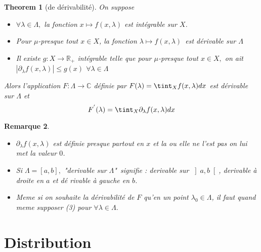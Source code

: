 \documentclass[3pt]{article}
\newtheorem{theorem}{Theorem}
\newtheorem{remark}[theorem]{Remarque}
\begin{document}
\bigskip 

\begin{theorem}[de d\'{e}rivabilit\'{e}]
On suppose

\begin{itemize}
\item $\forall \lambda \in \Lambda ,$ la fonction $x\longmapsto f(x,\lambda )
$ est int\'{e}grable sur $X$.

\item Pour $\mu $-presque tout $x\in X$, la fonction $\lambda \longmapsto
f(x,\lambda )$\ est d\'{e}rivable sur $\Lambda $

\item Il existe $g:X\rightarrow \mathbb{R}_{+}$ int\'{e}grable telle que
pour $\mu $-presque tout $x\in X,$ on ait $\left\vert \partial _{\lambda
}f(x,\lambda )\right\vert \leq g(x)$ $\forall \lambda \in \Lambda $
\end{itemize}

Alors l'application $F:\Lambda \rightarrow \mathbb{C}$ d\'{e}finie par $%
F(\lambda )=\tint_{X}f(x,\lambda )dx$ est d\'{e}rivable sur $\Lambda $ et 
\begin{equation*}
F^{^{\prime }}(\lambda )=\tint_{X}\partial _{\lambda }f(x,\lambda )dx
\end{equation*}
\end{theorem}

\bigskip 

\begin{remark}

\begin{itemize}
\item $\partial _{\lambda }f(x,\lambda )$ est d\'{e}finie presque partout en 
$x$ et la ou elle ne l'est pas on lui met la valeur $0$.

\item Si $\Lambda =\left[ a,b\right] ,$ "derivable sur $\Lambda $"\ signifie
: derivable sur $\left] a,b\right[ $, derivable \`{a} droite en $a$ et d\'{e}%
rivable \`{a} gauche en $b$.

\item Meme si on souhaite la d\'{e}rivabilit\'{e} de $F$ qu'en un point $%
\lambda _{0}\in \Lambda $, il faut quand meme supposer (3) pour $\forall
\lambda \in \Lambda .$ 
\end{itemize}
\end{remark}

\section{Distribution}
\end{document}
